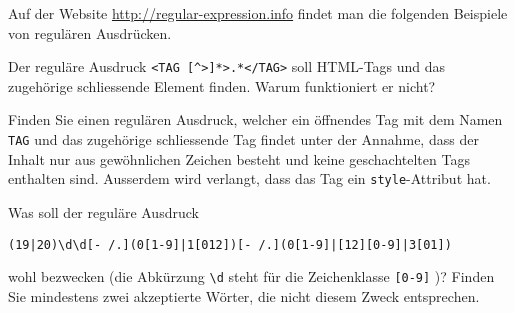 Auf der Website \url{http://regular-expression.info} findet man die folgenden
Beispiele von regulären Ausdrücken.
\begin{teilaufgaben}
\item
Der reguläre Ausdruck
\verb+<TAG [^>]*>.*</TAG>+
soll HTML-Tags und das zugehörige schliessende Element finden.
Warum funktioniert er nicht?
\item
Finden Sie einen regulären Ausdruck, welcher ein öffnendes Tag mit
dem Namen
\verb+TAG+
und das zugehörige schliessende Tag findet unter
der Annahme, dass der Inhalt nur aus gewöhnlichen Zeichen besteht und
keine geschachtelten Tags enthalten sind.
Ausserdem wird verlangt, dass das Tag ein \texttt{style}-Attribut hat.
\item
Was soll der reguläre Ausdruck
\begin{verbatim}
(19|20)\d\d[- /.](0[1-9]|1[012])[- /.](0[1-9]|[12][0-9]|3[01])
\end{verbatim}
wohl bezwecken (die Abkürzung \verb+\d+ steht für die Zeichenklasse
\verb+[0-9]+%
)?
Finden Sie mindestens zwei akzeptierte Wörter, die nicht diesem Zweck
entsprechen.
\end{teilaufgaben}


